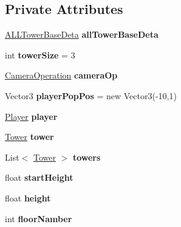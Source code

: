 \subsection*{Private Attributes}
\begin{DoxyCompactItemize}
\item 
\mbox{\label{class_a_l_l_tower_a5eee0d3b044f51b3c4827915dba03833}} 
\hyperlink{class_a_l_l_tower_base_deta}{A\+L\+L\+Tower\+Base\+Deta} {\bfseries all\+Tower\+Base\+Deta}
\item 
\mbox{\label{class_a_l_l_tower_a4b32fbbea95b9d14c38bd2459fe42bd2}} 
int {\bfseries tower\+Size} = 3
\item 
\mbox{\label{class_a_l_l_tower_a8d024829043e28b538b7d3c24d3d6004}} 
\hyperlink{class_camera_operation}{Camera\+Operation} {\bfseries camera\+Op}
\item 
\mbox{\label{class_a_l_l_tower_a08e4e7cbabbd283acf7cab3a5db6128d}} 
Vector3 {\bfseries player\+Pop\+Pos} = new Vector3(-\/10,1)
\item 
\mbox{\label{class_a_l_l_tower_ae9c0a673001d483cb785752f89d2da9b}} 
\hyperlink{class_player}{Player} {\bfseries player}
\item 
\mbox{\label{class_a_l_l_tower_a7e08abf89e7cf1b4bfbc750199a4395a}} 
\hyperlink{class_tower}{Tower} {\bfseries tower}
\item 
\mbox{\label{class_a_l_l_tower_a6a17167cf2e22569abba3dc9b5499359}} 
List$<$ \hyperlink{class_tower}{Tower} $>$ {\bfseries towers}
\item 
\mbox{\label{class_a_l_l_tower_aa2856e0c7f48411a03a385266e587e0b}} 
float {\bfseries start\+Height}
\item 
\mbox{\label{class_a_l_l_tower_a62f7dc14dada0e0ea582ffb5331ab26d}} 
float {\bfseries height}
\item 
\mbox{\label{class_a_l_l_tower_aec7478f9fadf68a6be8c0065d00c94d4}} 
int {\bfseries floor\+Namber}
\item 

\end{DoxyCompactItemize}

